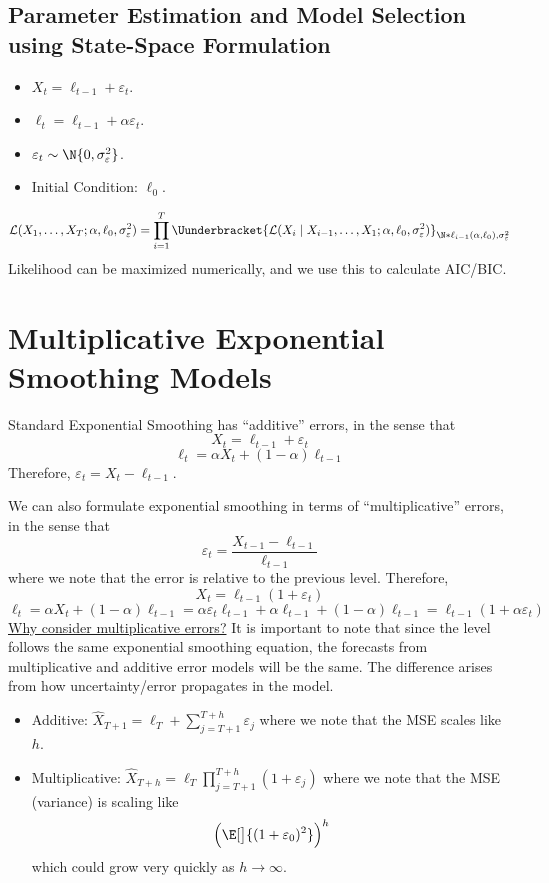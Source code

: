 \subsection*{Parameter Estimation and Model Selection using State-Space Formulation}
\begin{itemize}
    \item $ X_t=\ell_{t-1}+\varepsilon_t $.
    \item $ \ell_t=\ell_{t-1}+\alpha\varepsilon_t $.
    \item $ \varepsilon_t \sim \N{0,\sigma_\varepsilon^2} $.
    \item Initial Condition: $ \ell_0 $.
\end{itemize}
\[ \mathcal{L}(X_1,\ldots,X_T;\alpha,\ell_0,\sigma_\varepsilon^2)=
    \prod_{i=1}^T \Uunderbracket{\mathcal{L}(X_i\mid X_{i-1},\ldots,X_1;\alpha,\ell_0,\sigma_\varepsilon^2)}_{
    \N*{\ell_{i-1}(\alpha,\ell_0),\sigma_\varepsilon^2}
    } \]
Likelihood can be maximized numerically, and we use this to calculate AIC/BIC\@.

\section{Multiplicative Exponential Smoothing Models}
Standard Exponential Smoothing has ``additive'' errors, in the sense that
\[ X_t=\ell_{t-1}+\varepsilon_t \]
\[ \ell_t=\alpha X_t+(1-\alpha)\ell_{t-1} \]
Therefore, $ \varepsilon_t=X_t-\ell_{t-1} $.

We can also formulate exponential smoothing in terms of ``multiplicative''
errors, in the sense that
\[ \varepsilon_t=\frac{X_{t-1}-\ell_{t-1}}{\ell_{t-1}}  \]
where we note that the error is relative to the previous level. Therefore,
\[ X_t=\ell_{t-1}(1+\varepsilon_t) \]
\[ \ell_t=\alpha X_t+(1-\alpha)\ell_{t-1} =\alpha\varepsilon_t\ell_{t-1}+\alpha\ell_{t-1}+(1-\alpha)\ell_{t-1}
    =\ell_{t-1}(1+\alpha\varepsilon_t) \]
\underline{Why consider multiplicative errors?} It is important
to note that since the level follows the same exponential smoothing equation,
the forecasts from multiplicative and additive error models will be the same.
The difference arises from how uncertainty/error propagates in the model.
\begin{itemize}
    \item Additive: $ \hat{X}_{T+1}=\ell_T+\sum_{j=T+1}^{T+h} \varepsilon_j $
          where we note that the MSE scales like $ h $.
    \item Multiplicative: $ \hat{X}_{T+h}=\ell_T \prod_{j=T+1}^{T+h}(1+\varepsilon_j) $
          where we note that the MSE (variance) is scaling like
          \[ \Bigl(\E[\big]{(1+\varepsilon_0)^2}\Bigr)^h \]
          which could grow very quickly as $ h\to\infty $.
\end{itemize}
